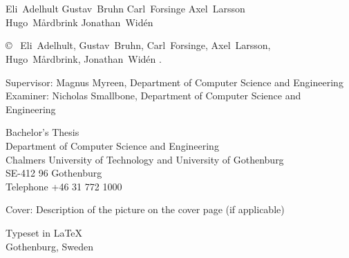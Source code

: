 \newpage
\thispagestyle{plain}
\vspace*{4.5cm}
\oneLineTitle\\
\oneLineSubtitle\\
Eli~Adelhult \setlength{\parskip}{1cm}
Gustav~Bruhn \setlength{\parskip}{1cm}
Carl~Forsinge \setlength{\parskip}{1cm}
Axel~Larsson \setlength{\parskip}{1cm}\\
Hugo~Mårdbrink \setlength{\parskip}{1cm}
Jonathan~Widén \setlength{\parskip}{1cm}

\copyright ~ Eli~Adelhult, Gustav~Bruhn, Carl~Forsinge, Axel~Larsson,\\ Hugo~Mårdbrink, Jonathan~Widén \the\year. \setlength{\parskip}{1cm}

Supervisor: Magnus Myreen, Department of Computer Science and Engineering\\
Examiner: Nicholas Smallbone, Department of Computer Science and Engineering \setlength{\parskip}{1cm}

Bachelor's Thesis \the\year\\	%
Department of Computer Science and Engineering\\
Chalmers University of Technology and University of Gothenburg\\
SE-412 96 Gothenburg\\
Telephone +46 31 772 1000 \setlength{\parskip}{0.5cm}

\vfill
Cover: Description of the picture on the cover page (if applicable)


Typeset in \LaTeX \\
Gothenburg, Sweden \the\year

